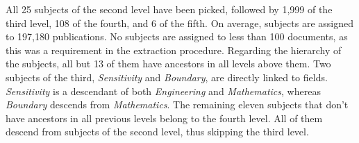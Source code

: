 All 25 subjects of the second level have been picked, followed by 1,999 of the third level, 108 of the fourth, and 6 of the fifth. On average, subjects are assigned to 197,180 publications. No subjects are assigned to less than 100 documents, as this was a requirement in the extraction procedure. Regarding the hierarchy of the subjects, all but 13 of them have ancestors in all levels above them. Two subjects of the third, \textit{Sensitivity} and \textit{Boundary}, are directly linked to fields. \textit{Sensitivity} is a descendant of both \textit{Engineering} and \textit{Mathematics}, whereas \textit{Boundary} descends from \textit{Mathematics}. The remaining eleven subjects that don't have ancestors in all previous levels belong to the fourth level. All of them descend from subjects of the second level, thus skipping the third level.